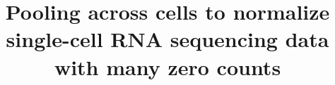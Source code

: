 \documentclass{bmcart}
\begin{document}
\begin{frontmatter}

\begin{fmbox}


\title{Pooling across cells to normalize single-cell RNA sequencing data with many zero counts}


\author[
   addressref={aff1},
   corref={aff1},
   email={aaron.lun@cruk.cam.ac.uk}   
]{ }
\author[
   addressref={aff2},
   email={kbach@ebi.ac.uk}
]{ }
\author[
    addressref={aff1,aff2},
    email={marioni@ebi.ac.uk}
]{ }


\address[id=aff1]{%
  ,
  ,                     %
  ,                        %
  ,                              %
}
\address[id=aff2]{%
  ,
  ,
  ,
}


\end{fmbox}
\end{frontmatter}
\end{document}
